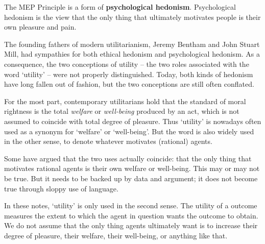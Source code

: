 The MEP Principle is a form of \textbf{psychological
  hedonism}. Psychological hedonism is the view that the only thing
that ultimately motivates people is their own pleasure and pain.

The founding fathers of modern utilitarianism, Jeremy Bentham and John Stuart
Mill, had sympathies for both ethical hedonism and psychological hedonism. As a
consequence, the two conceptions of utility -- the two roles associated with the
word `utility' -- were not properly distinguished. Today, both kinds of hedonism
have long fallen out of fashion, but the two conceptions are still often
conflated.


For the most part, contemporary utilitarians hold that the standard of moral
rightness is the total \emph{welfare} or \emph{well-being} produced by an act,
which is not assumed to coincide with total degree of pleasure. Thus `utility'
is nowadays often used as a synonym for `welfare' or `well-being'. But the word
is also widely used in the other sense, to denote whatever motivates (rational)
agents.

Some have argued that the two uses actually coincide: that the only
thing that motivates rational agents is their own welfare or
well-being. This may or may not be true. But it needs to be backed up
by data and argument; it does not become true through sloppy use of
language.

In these notes, `utility' is only used in the second sense. The utility of a
outcome measures the extent to which the agent in question wants the outcome to
obtain. We do not assume that the only thing agents ultimately want is to
increase their degree of pleasure, their welfare, their well-being, or anything
like that.



